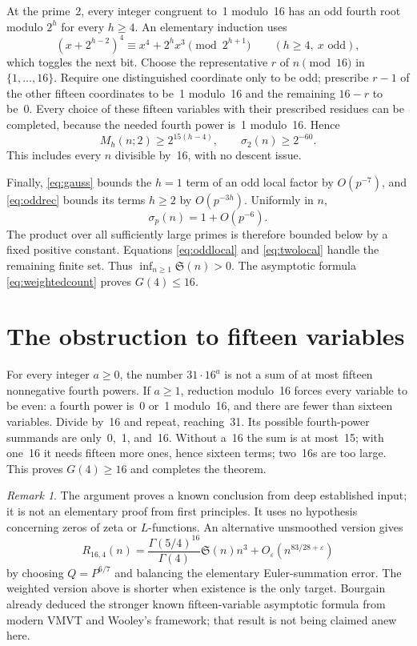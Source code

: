\documentclass[11pt]{article}
\theoremstyle{remark}\newtheorem*{remark}{Remark}
\newcommand{\eps}{\varepsilon}
\newcommand{\SSS}{\mathfrak S}
\begin{document}
At the prime~2, every integer congruent to~1 modulo~16 has an odd
fourth root modulo \(2^h\) for every \(h\ge4\). An elementary
induction uses
\[
 (x+2^{h-2})^4\equiv x^4+2^hx^3\pmod{2^{h+1}}
 \qquad(h\ge4,\ x\text{ odd}),
\]
which toggles the next bit. Choose the representative \(r\) of
\(n\pmod{16}\) in \(\{1,\ldots,16\}\). Require one distinguished
coordinate only to be odd; prescribe \(r-1\) of the other fifteen
coordinates to be~1 modulo~16 and the remaining \(16-r\) to be~0.
Every choice of these fifteen variables with their prescribed residues
can be completed, because the needed
fourth power is~1 modulo~16. Hence
\begin{equation}\label{eq:twolocal}
 M_h(n;2)\ge2^{15(h-4)},\qquad \sigma_2(n)\ge2^{-60}.
\end{equation}
This includes every \(n\) divisible by~16, with no descent issue.

Finally, \eqref{eq:gauss} bounds the \(h=1\) term of an odd local
factor by \(O(p^{-7})\), and \eqref{eq:oddrec} bounds its terms
\(h\ge2\) by \(O(p^{-3h})\). Uniformly in \(n\),
\[
 \sigma_p(n)=1+O(p^{-6}).
\]
The product over all sufficiently large primes is therefore bounded
below by a fixed positive constant. Equations \eqref{eq:oddlocal}
and \eqref{eq:twolocal} handle the remaining finite set. Thus
\(\inf_{n\ge1}\SSS(n)>0\). The asymptotic formula
\eqref{eq:weightedcount} proves \(G(4)\le16\).

\section{The obstruction to fifteen variables}

For every integer \(a\ge0\), the number \(31\cdot16^a\) is not a
sum of at most fifteen nonnegative fourth powers. If \(a\ge1\),
reduction modulo~16 forces every variable to be even: a fourth power
is~0 or~1 modulo~16, and there are fewer than sixteen variables.
Divide by~16 and repeat, reaching~31. Its possible fourth-power
summands are only~0,~1, and~16. Without a~16 the sum is at most~15;
with one~16 it needs fifteen more ones, hence sixteen terms; two~16s
are too large. This proves \(G(4)\ge16\) and completes the theorem.

\begin{remark}
The argument proves a known conclusion from deep established input;
it is not an elementary proof from first principles. It uses no
hypothesis concerning zeros of zeta or \(L\)-functions. An alternative
unsmoothed version gives
\[
 R_{16,4}(n)=\frac{\Gamma(5/4)^{16}}{\Gamma(4)}\SSS(n)n^3
 +O_\eps(n^{83/28+\eps})
\]
by choosing \(Q=P^{6/7}\) and balancing the elementary Euler-summation
error. The weighted version above is shorter when existence is the
only target. Bourgain \cite[Section~2, Theorem~3]{Bourgain} already
deduced the stronger known fifteen-variable asymptotic formula from
modern VMVT and Wooley's framework; that result is not being claimed
anew here.
\end{remark}
\end{document}
